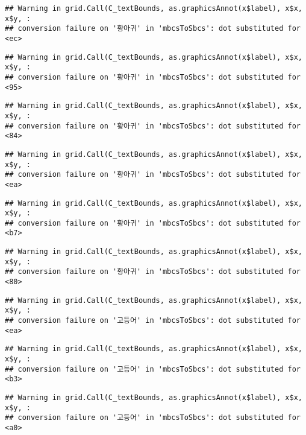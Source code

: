 \documentclass[
]{article}
\begin{document}
\begin{verbatim}
## Warning in grid.Call(C_textBounds, as.graphicsAnnot(x$label), x$x, x$y, :
## conversion failure on '황아귀' in 'mbcsToSbcs': dot substituted for <ec>
\end{verbatim}

\begin{verbatim}
## Warning in grid.Call(C_textBounds, as.graphicsAnnot(x$label), x$x, x$y, :
## conversion failure on '황아귀' in 'mbcsToSbcs': dot substituted for <95>
\end{verbatim}

\begin{verbatim}
## Warning in grid.Call(C_textBounds, as.graphicsAnnot(x$label), x$x, x$y, :
## conversion failure on '황아귀' in 'mbcsToSbcs': dot substituted for <84>
\end{verbatim}

\begin{verbatim}
## Warning in grid.Call(C_textBounds, as.graphicsAnnot(x$label), x$x, x$y, :
## conversion failure on '황아귀' in 'mbcsToSbcs': dot substituted for <ea>
\end{verbatim}

\begin{verbatim}
## Warning in grid.Call(C_textBounds, as.graphicsAnnot(x$label), x$x, x$y, :
## conversion failure on '황아귀' in 'mbcsToSbcs': dot substituted for <b7>
\end{verbatim}

\begin{verbatim}
## Warning in grid.Call(C_textBounds, as.graphicsAnnot(x$label), x$x, x$y, :
## conversion failure on '황아귀' in 'mbcsToSbcs': dot substituted for <80>
\end{verbatim}

\begin{verbatim}
## Warning in grid.Call(C_textBounds, as.graphicsAnnot(x$label), x$x, x$y, :
## conversion failure on '고등어' in 'mbcsToSbcs': dot substituted for <ea>
\end{verbatim}

\begin{verbatim}
## Warning in grid.Call(C_textBounds, as.graphicsAnnot(x$label), x$x, x$y, :
## conversion failure on '고등어' in 'mbcsToSbcs': dot substituted for <b3>
\end{verbatim}

\begin{verbatim}
## Warning in grid.Call(C_textBounds, as.graphicsAnnot(x$label), x$x, x$y, :
## conversion failure on '고등어' in 'mbcsToSbcs': dot substituted for <a0>
\end{verbatim}
\end{document}
